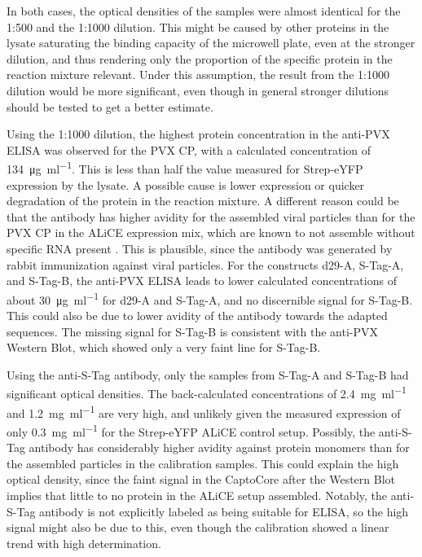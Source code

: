 In both cases, the optical densities of the samples were almost identical for the 1:500 and the 1:1000 dilution. This might be caused by other proteins in the lysate saturating the binding capacity of the microwell plate, even at the stronger dilution, and thus rendering only the proportion of the specific protein in the reaction mixture relevant. Under this assumption, the result from the 1:1000 dilution would be more significant, even though in general stronger dilutions should be tested to get a better estimate. 

Using the 1:1000 dilution, the highest protein concentration in the anti-PVX ELISA was observed for the PVX CP, with a calculated concentration of \SI{134}{\micro\gram\per\milli\litre}. This is less than half the value measured for Strep-eYFP expression by the lysate. A possible cause is lower expression or quicker degradation of the protein in the reaction mixture. A different reason could be that the antibody has higher avidity for the assembled viral particles than for the PVX CP in the ALiCE expression mix, which are known to not assemble without specific RNA present \cite{pvx_assembly}. This is plausible, since the antibody was generated by rabbit immunization against viral particles. For the constructs d29-A, S-Tag-A, and S-Tag-B, the anti-PVX ELISA leads to lower calculated concentrations of about \SI{30}{\micro\gram\per\milli\litre} for d29-A and S-Tag-A, and no discernible signal for S-Tag-B. This could also be due to lower avidity of the antibody towards the adapted sequences. The missing signal for S-Tag-B is consistent with the anti-PVX Western Blot, which showed only a very faint line for S-Tag-B. 

Using the anti-S-Tag antibody, only the samples from S-Tag-A and S-Tag-B had significant optical densities. The back-calculated concentrations of \SI{2.4}{\milli\gram\per\milli\litre} and \SI{1.2}{\milli\gram\per\milli\litre} are very high, and unlikely given the measured expression of only \SI{0.3}{\milli\gram\per\milli\litre} for the Strep-eYFP ALiCE control setup. Possibly, the anti-S-Tag antibody has considerably higher avidity against protein monomers than for the assembled particles in the calibration samples. This could explain the high optical density, since the faint signal in the CaptoCore after the Western Blot implies that little to no protein in the ALiCE setup assembled. Notably, the anti-S-Tag antibody is not explicitly labeled as being suitable for ELISA, so the high signal might also be due to this, even though the calibration showed a linear trend with high determination.

